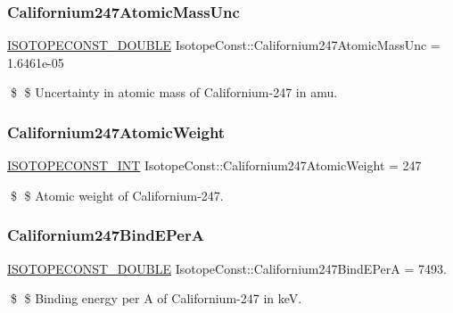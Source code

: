 \subsubsection{\texorpdfstring{Californium247\+Atomic\+Mass\+Unc}{Californium247AtomicMassUnc}}
{\footnotesize\ttfamily \mbox{\hyperlink{group___isotope_const-_macros_ga8f45a7272ce02c0b4c65c44636ed719a}{I\+S\+O\+T\+O\+P\+E\+C\+O\+N\+S\+T\+\_\+\+D\+O\+U\+B\+LE}} Isotope\+Const\+::\+Californium247\+Atomic\+Mass\+Unc = 1.\+6461e-\/05}

\$ \$ Uncertainty in atomic mass of Californium-\/247 in amu. \mbox{\label{group___isotope_const-_californium-_cf247_gaaa6cf36c4e5fc2678ded77fc4bdba1b9}} 
\subsubsection{\texorpdfstring{Californium247\+Atomic\+Weight}{Californium247AtomicWeight}}
{\footnotesize\ttfamily \mbox{\hyperlink{group___isotope_const-_macros_ga5f18360b3e99483a35c32d789e62621c}{I\+S\+O\+T\+O\+P\+E\+C\+O\+N\+S\+T\+\_\+\+I\+NT}} Isotope\+Const\+::\+Californium247\+Atomic\+Weight = 247}

\$ \$ Atomic weight of Californium-\/247. \mbox{\label{group___isotope_const-_californium-_cf247_gabb6d677cf72ad67423b205986e6d15f8}} 
\subsubsection{\texorpdfstring{Californium247\+Bind\+E\+PerA}{Californium247BindEPerA}}
{\footnotesize\ttfamily \mbox{\hyperlink{group___isotope_const-_macros_ga8f45a7272ce02c0b4c65c44636ed719a}{I\+S\+O\+T\+O\+P\+E\+C\+O\+N\+S\+T\+\_\+\+D\+O\+U\+B\+LE}} Isotope\+Const\+::\+Californium247\+Bind\+E\+PerA = 7493.}

\$ \$ Binding energy per A of Californium-\/247 in keV. \mbox{\label{group___isotope_const-_californium-_cf247_ga360d99c12ebcdad5ea13a35feab543ea}} 
